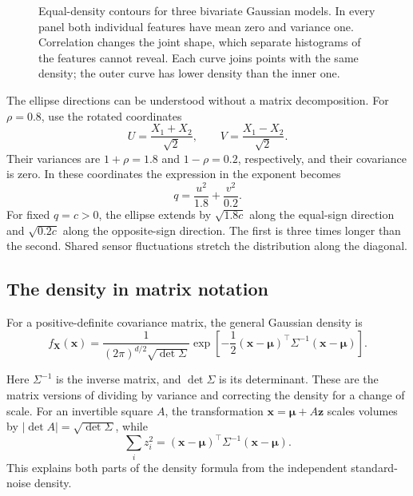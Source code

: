 \begin{figure}[htbp]
  \centering
  
  \caption{Equal-density contours for three bivariate Gaussian models.
  In every panel both individual features have mean zero and variance
  one. Correlation changes the joint shape, which separate histograms
  of the features cannot reveal. Each curve joins points with the same
  density; the outer curve has lower density than the inner one.}
  \label{fig:gaussian-correlation-contours}
\end{figure}

The ellipse directions can be understood without a matrix decomposition.
For \(\rho=0.8\), use the rotated coordinates
\[
  U=\frac{X_1+X_2}{\sqrt2},\qquad
  V=\frac{X_1-X_2}{\sqrt2}.
\]
Their variances are \(1+\rho=1.8\) and \(1-\rho=0.2\), respectively,
and their covariance is zero. In these coordinates the expression in
the exponent becomes
\[
  q=\frac{u^2}{1.8}+\frac{v^2}{0.2}.
\]
For fixed \(q=c>0\), the ellipse extends by \(\sqrt{1.8c}\) along
the equal-sign direction and \(\sqrt{0.2c}\) along the opposite-sign
direction. The first is three times longer than the second. Shared
sensor fluctuations stretch the distribution along the diagonal.

\subsection{The density in matrix notation}

\begin{result}
For a positive-definite covariance matrix, the general Gaussian density
is
\begin{equation}
  f_{\mathbf X}(\mathbf x)
  =\frac{1}{(2\pi)^{d/2}\sqrt{\det\Sigma}}
    \exp\!\left[-\frac12(\mathbf x-\boldsymbol\mu)^\top
      \Sigma^{-1}(\mathbf x-\boldsymbol\mu)\right].
  \label{eq:multivariate-gaussian-density}
\end{equation}
\end{result}
Here \(\Sigma^{-1}\) is the inverse matrix, and \(\det\Sigma\) is its
determinant. These are the matrix versions of dividing by variance and
correcting the density for a change of scale. For an invertible square
\(A\), the transformation \(\mathbf x=\boldsymbol\mu+A\mathbf z\)
scales volumes by \(|\det A|=\sqrt{\det\Sigma}\), while
\[
  \sum_i z_i^2
  =(\mathbf x-\boldsymbol\mu)^\top\Sigma^{-1}
      (\mathbf x-\boldsymbol\mu).
\]
This explains both parts of the density formula from the independent
standard-noise density.


